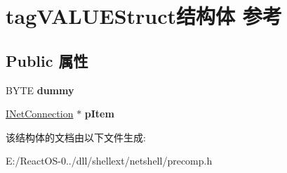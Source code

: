 \hypertarget{structtag_v_a_l_u_e_struct}{}\section{tag\+V\+A\+L\+U\+E\+Struct结构体 参考}
\label{structtag_v_a_l_u_e_struct}
\subsection*{Public 属性}
\begin{DoxyCompactItemize}
\item 
\mbox{\label{structtag_v_a_l_u_e_struct_ae5be23ef1f673132f7f3598ddaaeef5d}} 
B\+Y\+TE {\bfseries dummy}
\item 
\mbox{\label{structtag_v_a_l_u_e_struct_aee8b19250856e755fccf9e86721d1a34}} 
\hyperlink{interface_i_net_connection}{I\+Net\+Connection} $\ast$ {\bfseries p\+Item}
\end{DoxyCompactItemize}


该结构体的文档由以下文件生成\+:\begin{DoxyCompactItemize}
\item 
E\+:/\+React\+O\+S-\/0../dll/shellext/netshell/precomp.\+h\end{DoxyCompactItemize}
